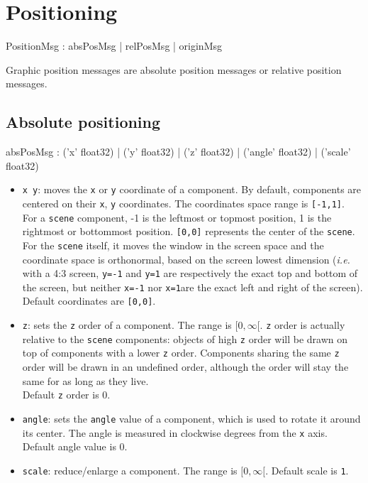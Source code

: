 \documentclass[a4paper,twoside]{report}
\newcommand{\sublevel}[1]	{\section{#1}}
\newcommand{\subsublevel}[1]	{\subsection{#1}}
\newcommand{\OSC}[1]		{\texttt{#1}}
\newcommand{\values}[1]	{\texttt{#1}}
\begin{document}
\sublevel{Positioning}

\begin{rail}
PositionMsg : 		absPosMsg 
				|	relPosMsg 
				|	originMsg 
\end{rail}

Graphic position messages are absolute position messages or relative position messages.

\subsublevel{Absolute positioning}

\begin{rail}
absPosMsg :  
			('x' float32)
		| 	('y' float32)
		| 	('z' float32)
		| 	('angle' float32)
		| 	('scale' float32) 
\end{rail}

\begin{itemize}
\item \OSC{x y}: moves the \values{x} or \values{y} coordinate of a component. By default, components are centered on their \values{x}, \values{y} coordinates. The coordinates space range is \values{[-1,1]}. \\
For a \OSC{scene} component, -1 is the leftmost or topmost position, 1 is the rightmost or bottommost position. \values{[0,0]} represents the center of the \OSC{scene}. \\
For the \OSC{scene} itself, it moves the window in the screen space and the coordinate space is orthonormal, based on the screen lowest dimension (\emph{i.e.} with a 4:3 screen, \OSC{y=-1} and \OSC{y=1} are respectively the exact top and bottom of the screen, but neither \OSC{x=-1} nor \OSC{x=1}are the exact left and right of the screen). \\
Default coordinates are \values{[0,0]}.
\item \OSC{z}: sets the \values{z} order of a component. The range is $[0,\infty[$. \values{z} order is actually relative to the \OSC{scene} components: objects of high \values{z} order will be drawn on top of components with a lower \values{z} order. Components sharing the same \values{z} order will be drawn in an undefined order, although the order will stay the same for as long as they live. \\
Default \values{z} order is 0.
\item \OSC{angle}: sets the \values{angle} value of a component, which is used to rotate it around its center. The angle is measured in clockwise degrees from the \values{x} axis.\\
Default angle value is 0.
\item \OSC{scale}: reduce/enlarge a component. The range is $[0,\infty[$. Default scale is \values{1}.
\end{itemize}
\end{document}
